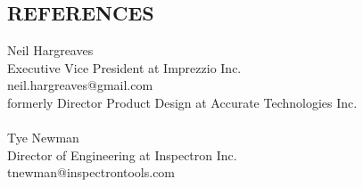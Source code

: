 \documentclass[line,margin]{res}
\begin{document}
\begin{resume}
\section{REFERENCES}
    Neil Hargreaves\\
    Executive Vice President at Imprezzio Inc.\\
    neil.hargreaves@gmail.com\\
    formerly Director Product Design at Accurate Technologies Inc.\\
\\
    Tye Newman\\
    Director of Engineering at Inspectron Inc.\\
    tnewman@inspectrontools.com\\
 

\end{resume}
\end{document}
